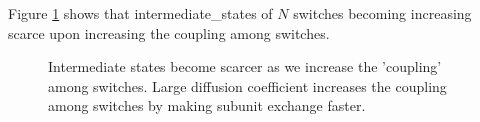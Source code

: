 \documentclass[a4paper]{article}
\begin{document}
Figure \ref{fig:intermediate_state_distribution} shows that
\gls{intermediate_states} of $N$ switches becoming increasing scarce upon 
increasing the coupling among switches.

\begin{figure}[ht!]
    \begin{center}
    \end{center}
    \caption{Intermediate states become scarcer as we increase the 'coupling'
        among switches. Large diffusion coefficient increases the coupling among
        switches by making subunit exchange faster.
    }
    \label{fig:intermediate_state_distribution}
\end{figure}

\glsaddall
\printglossaries
\end{document}
